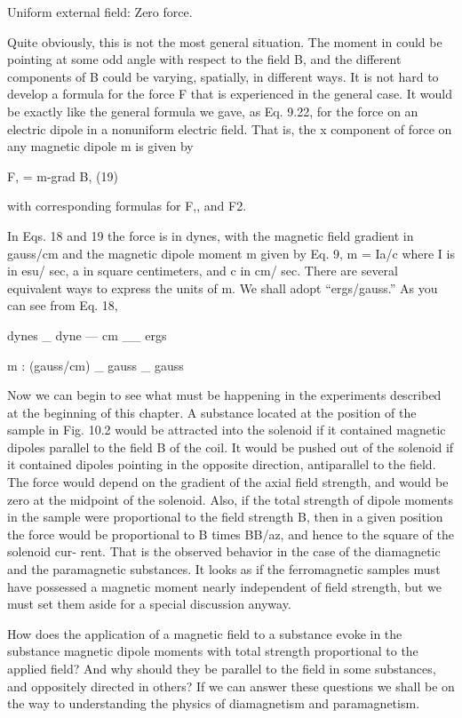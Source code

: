 {{Uniform external field: Zero force.

Quite obviously, this is not the most general situation. The
moment in could be pointing at some odd angle with respect to the
field B, and the different components of B could be varying, spatially,
in different ways. It is not hard to develop a formula for the force F
that is experienced in the general case. It would be exactly like the
general formula we gave, as Eq. 9.22, for the force on an electric
dipole in a nonuniform electric field. That is, the x component of
force on any magnetic dipole m is given by

F, = m-grad B, (19)

with corresponding formulas for F,, and F2.

In Eqs. 18 and 19 the force is in dynes, with the magnetic field
gradient in gauss/cm and the magnetic dipole moment m given by
Eq. 9, m = Ia/c where I is in esu/ sec, a in square centimeters, and c
in cm/ sec. There are several equivalent ways to express the units
of m. We shall adopt ``ergs/gauss.'' As you can see from Eq. 18,

dynes _ dyne --- cm __ ergs

m : (gauss/cm) _ gauss _ gauss

Now we can begin to see what must be happening in the experiments
described at the beginning of this chapter. A substance
located at the position of the sample in Fig. 10.2 would be attracted
into the solenoid if it contained magnetic dipoles parallel to the field
B of the coil. It would be pushed out of the solenoid if it contained
dipoles pointing in the opposite direction, antiparallel to the field.
The force would depend on the gradient of the axial field strength,
and would be zero at the midpoint of the solenoid. Also, if the total
strength of dipole moments in the sample were proportional to the
field strength B, then in a given position the force would be proportional
to B times BB/az, and hence to the square of the solenoid cur-
rent. That is the observed behavior in the case of the diamagnetic
and the paramagnetic substances. It looks as if the ferromagnetic
samples must have possessed a magnetic moment nearly independent
of field strength, but we must set them aside for a special discussion
anyway.

How does the application of a magnetic field to a substance evoke
in the substance magnetic dipole moments with total strength proportional
to the applied field? And why should they be parallel to
the field in some substances, and oppositely directed in others? If
we can answer these questions we shall be on the way to understanding
the physics of diamagnetism and paramagnetism.

}}
